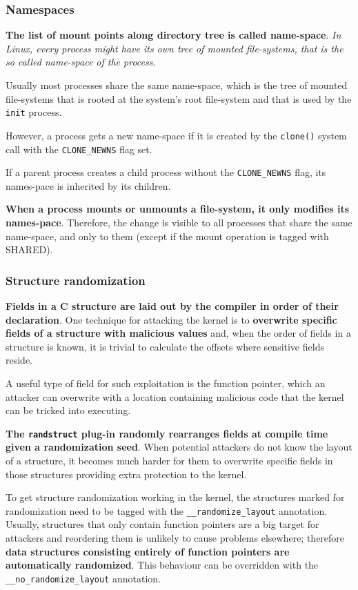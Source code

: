 \documentclass[10pt,a4paper]{article}
\begin{document}
\subsubsection{Namespaces}

\textbf{The list of mount points along directory tree is called name-space}. \textit{In Linux, every process might have its own tree of mounted file-systems, that is the so called name-space of the process}.

Usually most processes share the same name-space, which is the tree of mounted file-systems that is rooted at the system's root file-system and that is used by the \texttt{init} process. 

However, a process gets a new name-space if it is created by the \texttt{clone()} system call with the \texttt{CLONE\_NEWNS} flag set. 

If a parent process creates a child process without the \texttt{CLONE\_NEWNS} flag, its names-pace is inherited by its children.

\textbf{When a process mounts or unmounts a file-system, it only modifies its names-pace}. Therefore, the change is visible to all processes that share the same name-space, and only to them (except if the mount operation is tagged with SHARED).


\subsubsection{Structure randomization}

\textbf{Fields in a C structure are laid out by the compiler in order of their declaration}. One technique for attacking the kernel is to \textbf{overwrite specific fields of a structure with malicious values} and, when the order of fields in a structure is known, it is trivial to calculate the offsets where sensitive fields reside. 

A useful type of field for such exploitation is the function pointer, which an attacker can overwrite with a location containing malicious code that the kernel can be tricked into executing. 

\textbf{The \texttt{randstruct} plug-in randomly rearranges fields at compile time given a randomization seed}. When potential attackers do not know the layout of a structure, it becomes much harder for them to overwrite specific fields in those structures providing extra protection to the kernel. 

To get structure randomization working in the kernel, the structures marked for randomization need to be tagged with the \texttt{\_\_randomize\_layout} annotation. Usually, structures that only contain function pointers are a big target for attackers and reordering them is unlikely to cause problems elsewhere; therefore \textbf{data structures consisting entirely of function pointers are automatically randomized}. This behaviour can be overridden with the \texttt{\_\_no\_randomize\_layout} annotation. 
\end{document}
